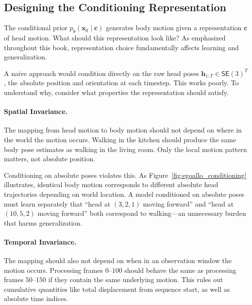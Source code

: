 \documentclass[../../book-main.tex]{subfiles}
\begin{document}
\subsection{Designing the Conditioning Representation}
\label{sub:egoallo_representation}

The conditional prior $p_\theta(\boldsymbol{x}_0 \mid \boldsymbol{c})$ generates
body motion given a representation $\boldsymbol{c}$ of head motion. What
should this representation look like? As emphasized throughout this
book, representation choice fundamentally affects learning and generalization.

A naive approach would condition directly on the raw head poses
$\boldsymbol{h}_{1:T} \in \mathsf{SE}(3)^T$, the absolute position
and orientation
at each timestep. This works poorly. To understand why, consider what
properties the representation should satisfy.

\paragraph{Spatial Invariance.}
The mapping from head motion to body motion should not depend on
where in the world the motion occurs. Walking in the kitchen should
produce the same body pose estimates as walking in the living room.
Only the local motion pattern matters, not absolute position.

Conditioning on absolute poses violates this. As
Figure~\ref{fig:egoallo_conditioning} illustrates, identical body
motion corresponds to different absolute head trajectories depending
on world location. A model conditioned on absolute poses must learn
separately that ``head at $(3,2,1)$ moving forward'' and ``head at
$(10,5,2)$ moving forward'' both correspond to walking---an
unnecessary burden that harms generalization.

\paragraph{Temporal Invariance.}
The mapping should also not depend on when in an observation window
the motion occurs. Processing frames $0$--$100$ should behave the
same as processing frames $50$--$150$ if they contain the same
underlying motion. This rules out cumulative quantities like total
displacement from sequence start, as well as absolute time indices.
\end{document}
